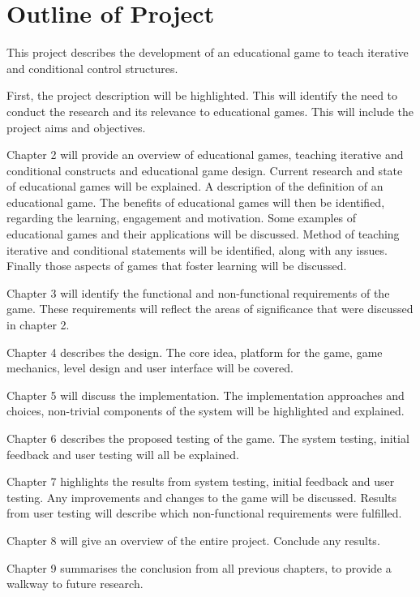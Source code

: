 \documentclass[a4paper,11.5pt]{report}
\numberwithin{figure}{section}
\numberwithin{table}{section}
\numberwithin{equation}{section}
\numberwithin{equation}{section}
\begin{document}
\newpage
\listoftables  

\newpage
\hfill

\section*{\Huge{Outline of Project}}

This project describes the development of an educational game to teach iterative and conditional control structures.

First, the project description will be highlighted. This will identify the need to conduct the research and its relevance to educational games. This will include the project aims and objectives.

Chapter 2 will provide an overview of educational games, teaching iterative and conditional constructs and educational game design. Current research and state of educational games will be explained. A description of the definition of an educational game. The benefits of educational games will then be identified, regarding the learning, engagement and motivation. Some examples of educational games and their applications will be discussed. Method of teaching iterative and conditional statements will be identified, along with any issues. Finally those aspects of games that foster learning will be discussed.

Chapter 3 will identify the functional and non-functional requirements of the game. These requirements will reflect the areas of significance that were discussed in chapter 2.

Chapter 4 describes the design. The core idea, platform for the game, game mechanics, level design and user interface will be covered. 

Chapter 5 will discuss the implementation. The implementation approaches and choices, non-trivial components of the system will be highlighted and explained.

Chapter 6 describes the proposed testing of the game. The system testing, initial feedback and user testing will all be explained.  

Chapter 7 highlights the results from system testing, initial feedback and user testing. Any improvements and changes to the game will be discussed. Results from user testing will describe which non-functional requirements were fulfilled.

Chapter 8 will give an overview of the entire project. Conclude any results. 

Chapter 9 summarises the conclusion from all previous chapters, to provide a walkway to future research.
\end{document}
